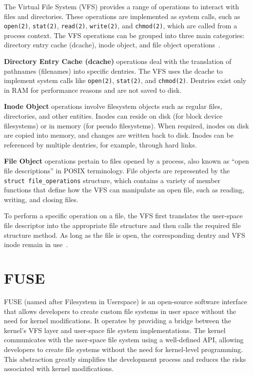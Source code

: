 The Virtual File System (VFS) provides a range of operations to interact with files and directories.
These operations are implemented as system calls, such as \texttt{open(2)}, \texttt{stat(2)}, \texttt{read(2)}, \texttt{write(2)}, and \texttt{chmod(2)}, which are called from a process context.
The VFS operations can be grouped into three main categories: directory entry cache (dcache), inode object, and file object operations~\cite{vfs}.

\textbf{Directory Entry Cache (dcache)} operations deal with the translation of pathnames (filenames) into specific dentries.
The VFS uses the dcache to implement system calls like \texttt{open(2)}, \texttt{stat(2)}, and \texttt{chmod(2)}.
Dentries exist only in RAM for performance reasons and are not saved to disk.

\textbf{Inode Object} operations involve filesystem objects such as regular files, directories, and other entities.
Inodes can reside on disk (for block device filesystems) or in memory (for pseudo filesystems).
When required, inodes on disk are copied into memory, and changes are written back to disk.
Inodes can be referenced by multiple dentries, for example, through hard links.

\textbf{File Object} operations pertain to files opened by a process, also known as ``open file descriptions'' in POSIX terminology.
File objects are represented by the \texttt{struct file\_operations} structure, which contains a variety of member functions that define how the VFS can manipulate an open file, such as reading, writing, and closing files.

To perform a specific operation on a file, the VFS first translates the user-space file descriptor into the appropriate file structure and then calls the required file structure method.
As long as the file is open, the corresponding dentry and VFS inode remain in use~\cite{vfs}.


\section{FUSE}\label{sec:fuse}


FUSE (named after Filesystem in Userspace) is an open-source software interface that allows developers to create custom file systems in user space without the need for kernel modifications.
It operates by providing a bridge between the kernel's VFS layer and user-space file system implementations.
The kernel communicates with the user-space file system using a well-defined API, allowing developers to create file systems without the need for kernel-level programming.
This abstraction greatly simplifies the development process and reduces the risks associated with kernel modifications.

